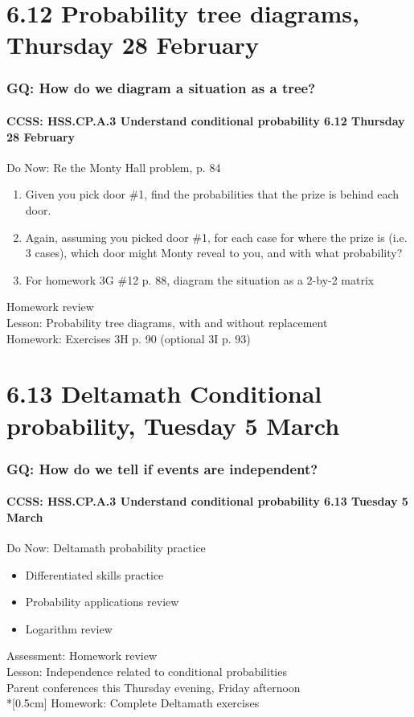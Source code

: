 \documentclass{beamer}
\begin{document}
\section{6.12 Probability tree diagrams, Thursday 28 February}
  \frame
  {
    \frametitle{GQ: How do we diagram a situation as a tree?}
    \framesubtitle{CCSS: HSS.CP.A.3 Understand conditional probability \hfill \alert{6.12 Thursday 28 February}}

    \begin{block}{Do Now: Re the Monty Hall problem, p. 84}
      \begin{enumerate}
        \item Given you pick door \#1, find the probabilities that the prize is behind each door.
        \item Again, assuming you picked door \#1, for each case for where the prize is (i.e. 3 cases), which door might Monty reveal to you, and with what probability?
        \item For homework 3G \#12 p. 88, diagram the situation as a 2-by-2 matrix
      \end{enumerate}
    \end{block}
    Homework review\\
    Lesson: Probability tree diagrams, with and without replacement\\[0.5cm]
    Homework: Exercises 3H p. 90 (optional 3I p. 93)
  }

\section{6.13 Deltamath Conditional probability, Tuesday 5 March}
  \frame
  {
    \frametitle{GQ: How do we tell if events are independent?}
    \framesubtitle{CCSS: HSS.CP.A.3 Understand conditional probability \hfill \alert{6.13 Tuesday 5 March}}
      \begin{block}{Do Now: Deltamath probability practice}
        \begin{itemize}
          \item Differentiated skills practice
          \item Probability applications review
          \item Logarithm review
        \end{itemize}
      \end{block}
    Assessment: Homework review\\
    Lesson: Independence related to conditional probabilities\\
    \alert{Parent conferences this Thursday evening, Friday afternoon}\\*[0.5cm]
    Homework: Complete Deltamath exercises
  }
\end{document}
